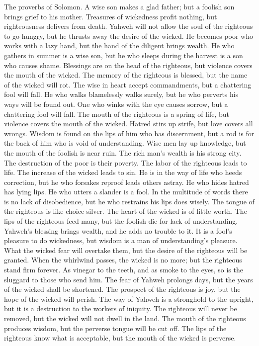  The proverbs of Solomon. A wise son makes a glad father;
but a foolish son brings grief to his mother.  Treasures of
wickedness profit nothing, but righteousness delivers from death.
 Yahweh will not allow the soul of the righteous to go
hungry, but he thrusts away the desire of the wicked.  He
becomes poor who works with a lazy hand, but the hand of the diligent
brings wealth.  He who gathers in summer is a wise son, but
he who sleeps during the harvest is a son who causes shame. 
Blessings are on the head of the righteous, but violence covers the
mouth of the wicked.  The memory of the righteous is
blessed, but the name of the wicked will rot.  The wise in
heart accept commandments, but a chattering fool will fall. 
He who walks blamelessly walks surely, but he who perverts his ways will
be found out.  One who winks with the eye causes sorrow,
but a chattering fool will fall.  The mouth of the
righteous is a spring of life, but violence covers the mouth of the
wicked.  Hatred stirs up strife, but love covers all
wrongs.  Wisdom is found on the lips of him who has
discernment, but a rod is for the back of him who is void of
understanding.  Wise men lay up knowledge, but the mouth of
the foolish is near ruin.  The rich man's wealth is his
strong city. The destruction of the poor is their poverty. 
The labor of the righteous leads to life. The increase of the wicked
leads to sin.  He is in the way of life who heeds
correction, but he who forsakes reproof leads others astray.
 He who hides hatred has lying lips. He who utters a
slander is a fool.  In the multitude of words there is no
lack of disobedience, but he who restrains his lips does wisely.
 The tongue of the righteous is like choice silver. The
heart of the wicked is of little worth.  The lips of the
righteous feed many, but the foolish die for lack of understanding.
 Yahweh's blessing brings wealth, and he adds no trouble to
it.  It is a fool's pleasure to do wickedness, but wisdom
is a man of understanding's pleasure.  What the wicked fear
will overtake them, but the desire of the righteous will be granted.
 When the whirlwind passes, the wicked is no more; but the
righteous stand firm forever.  As vinegar to the teeth, and
as smoke to the eyes, so is the sluggard to those who send him.
 The fear of Yahweh prolongs days, but the years of the
wicked shall be shortened.  The prospect of the righteous
is joy, but the hope of the wicked will perish.  The way of
Yahweh is a stronghold to the upright, but it is a destruction to the
workers of iniquity.  The righteous will never be removed,
but the wicked will not dwell in the land.  The mouth of
the righteous produces wisdom, but the perverse tongue will be cut off.
 The lips of the righteous know what is acceptable, but the
mouth of the wicked is perverse.

